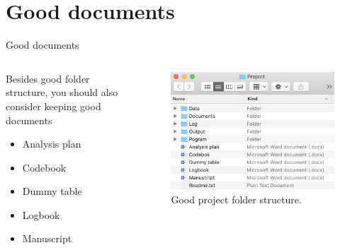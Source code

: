 \section{Good documents}
	\begin{frame}{Good documents}
	\begin{columns}
	\begin{column}{0.5\textwidth}
	Besides good folder structure, you should also consider keeping good documents
		\begin{itemize}
				\item Analysis plan
				\item Codebook\footnotemark
				\item Dummy table
				\item Logbook\footnotemark[\value{footnote}]
				\item Manuscript
		\end{itemize}
	
	\end{column}
	
	\begin{column}{0.5\textwidth}
	\begin{figure}
			\includegraphics[scale=0.4]{image/structure}
			\caption{Good project folder structure.}
	\end{figure}
	\end{column}
	\end{columns}
\end{frame}

